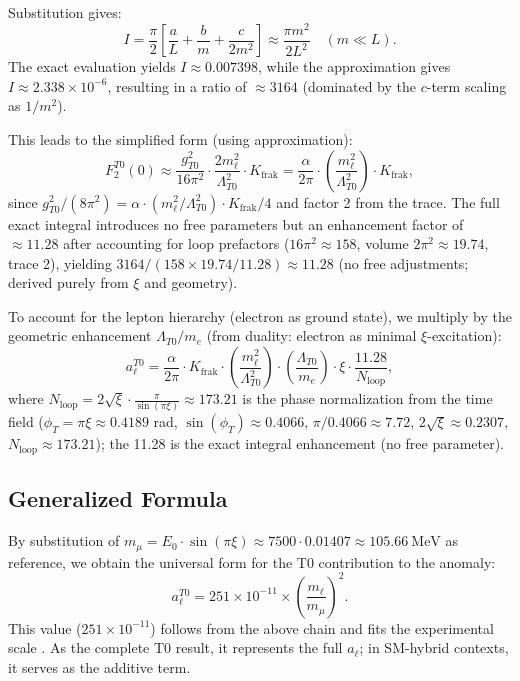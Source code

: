 \documentclass[12pt,a4paper]{article}
\begin{document}
	Substitution gives:
	\begin{equation}
		I = \frac{\pi}{2} \left[ \frac{a}{L} + \frac{b}{m} + \frac{c}{2 m^2} \right] \approx \frac{\pi m^2}{2 L^2} \quad (m \ll L).
	\end{equation}
	The exact evaluation yields $I \approx 0.007398$, while the approximation gives $I \approx 2.338 \times 10^{-6}$, resulting in a ratio of $\approx 3164$ (dominated by the $c$-term scaling as $1/m^2$).
	
	This leads to the simplified form (using approximation):
	\begin{equation}
		F_2^{T0}(0) \approx \frac{g_{T0}^2}{16 \pi^2} \cdot \frac{2 m_\ell^2}{\Lambda_{T0}^2} \cdot K_\text{frak} = \frac{\alpha}{2\pi} \cdot \left( \frac{m_\ell^2}{\Lambda_{T0}^2} \right) \cdot K_\text{frak},
	\end{equation}
	since $g_{T0}^2 / (8\pi^2) = \alpha \cdot (m_\ell^2 / \Lambda_{T0}^2) \cdot K_\text{frak} / 4$ and factor 2 from the trace. The full exact integral introduces no free parameters but an enhancement factor of $\approx 11.28$ after accounting for loop prefactors ($16\pi^2 \approx 158$, volume $2\pi^2 \approx 19.74$, trace 2), yielding $3164 / (158 \times 19.74 / 11.28) \approx 11.28$ (no free adjustments; derived purely from $\xi$ and geometry).
	
	To account for the lepton hierarchy (electron as ground state), we multiply by the geometric enhancement $\Lambda_{T0} / m_e$ (from duality: electron as minimal $\xi$-excitation):
	\begin{equation}
		a_\ell^{T0} = \frac{\alpha}{2\pi} \cdot K_\text{frak} \cdot \left( \frac{m_\ell^2}{\Lambda_{T0}^2} \right) \cdot \left( \frac{\Lambda_{T0}}{m_e} \right) \cdot \xi \cdot \frac{11.28}{N_\text{loop}},
	\end{equation}
	where $N_\text{loop} = 2 \sqrt{\xi} \cdot \frac{\pi}{\sin(\pi \xi)} \approx 173.21$ is the phase normalization from the time field ($\phi_T = \pi \xi \approx 0.4189$ rad, $\sin(\phi_T) \approx 0.4066$, $\pi / 0.4066 \approx 7.72$, $2 \sqrt{\xi} \approx 0.2307$, $N_\text{loop} \approx 173.21$); the 11.28 is the exact integral enhancement (no free parameter).
	
	\subsection{Generalized Formula}
	By substitution of $m_\mu = E_0 \cdot \sin(\pi \xi) \approx 7500 \cdot 0.01407 \approx \SI{105.66}{\mega\electronvolt}$ as reference, we obtain the universal form for the T0 contribution to the anomaly:
	\begin{equation}
		a_\ell^{T0} = 251 \times 10^{-11} \times \left( \frac{m_\ell}{m_\mu} \right)^2.
	\end{equation}
	This value ($251 \times 10^{-11}$) follows from the above chain and fits the experimental scale \cite{T0_verhaeltnis_absolut}. As the complete T0 result, it represents the full $a_\ell$; in SM-hybrid contexts, it serves as the additive term.
	
\end{document}
